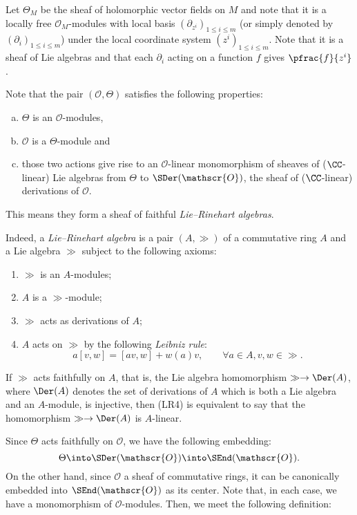 Let $\Theta_M$ be the sheaf of holomorphic vector fields on $M$ and
note that it is a locally free $\mathscr{O}_M$-modules with local basis 
$(\partial_{z^i})_{1\le i\le m}$ 
(or simply denoted by $(\partial_i)_{1\le i\le m}$) 
under the local coordinate system $(z^i)_{1\le i\le m}$. 
Note that it is a sheaf of Lie algebras and that
each $\partial_i$ acting on a function $f$ gives $\pfrac{f}{z^i}$. 

Note that the pair $(\mathscr{O},\Theta)$ satisfies the following properties: 
\begin{enumerate}[(a)]
\item $\Theta$ is an $\mathscr{O}$-modules,
\item $\mathscr{O}$ is a $\Theta$-module and
\item those two actions give rise to an $\mathscr{O}$-linear 
monomorphism of sheaves of ($\CC$-linear) Lie algebras from $\Theta$ to 
$\SDer(\mathscr{O})$, the sheaf of ($\CC$-linear) derivations of $\mathscr{O}$.
\end{enumerate}
This means they form a sheaf of faithful \emph{Lie–Rinehart algebras}. 

\begin{Rem}
\small
Indeed, a \emph{Lie–Rinehart algebra} is a pair $(A,\gg)$ of 
a commutative ring $A$ and a Lie algebra $\gg$ 
subject to the following axioms:
\begin{enumerate}[(LR1)]
\item $\gg$ is an $A$-modules;
\item $A$ is a $\gg$-module;
\item $\gg$ acts as derivations of $A$;
\item $A$ acts on $\gg$ by the following \emph{Leibniz rule}:
\[
a[v,w] = [av,w] + w(a)v,
\qquad
\forall a\in A, v,w\in\gg.
\]
\end{enumerate}
If $\gg$ acts faithfully on $A$, that is, 
the Lie algebra homomorphism $\gg\to\Der(A)$, 
where $\Der(A)$ denotes the set of derivations of $A$ which 
is both a Lie algebra and an $A$-module, is injective, 
then (LR4) is equivalent to say that 
the homomorphism $\gg\to\Der(A)$ is $A$-linear.
\end{Rem}

Since $\Theta$ acts faithfully on $\mathscr{O}$, we have the following embedding:
\[
\Theta\into\SDer(\mathscr{O})\into\SEnd(\mathscr{O}).
\]
On the other hand, since $\mathscr{O}$ a sheaf of commutative rings, 
it can be canonically embedded into $\SEnd(\mathscr{O})$ as its center. 
Note that, in each case, we have a monomorphism of $\mathscr{O}$-modules.
Then, we meet the following definition:

